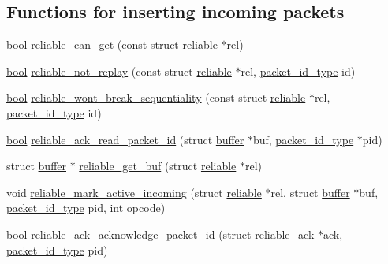 \subsection*{Functions for inserting incoming packets}
\begin{DoxyCompactItemize}
\item 
\hyperlink{automatic_8c_abb452686968e48b67397da5f97445f5b}{bool} \hyperlink{group__reliable_ga68f5e71b155cdcfabca18d028d336311}{reliable\+\_\+can\+\_\+get} (const struct \hyperlink{structreliable}{reliable} $\ast$rel)
\item 
\hyperlink{automatic_8c_abb452686968e48b67397da5f97445f5b}{bool} \hyperlink{group__reliable_ga907fd32837c50b4266eb5db1c56f9b13}{reliable\+\_\+not\+\_\+replay} (const struct \hyperlink{structreliable}{reliable} $\ast$rel, \hyperlink{packet__id_8h_a345f753b1c6ea20d24409e769aadb7e6}{packet\+\_\+id\+\_\+type} id)
\item 
\hyperlink{automatic_8c_abb452686968e48b67397da5f97445f5b}{bool} \hyperlink{group__reliable_gad2d6e3bde9beced3d69bbba652730439}{reliable\+\_\+wont\+\_\+break\+\_\+sequentiality} (const struct \hyperlink{structreliable}{reliable} $\ast$rel, \hyperlink{packet__id_8h_a345f753b1c6ea20d24409e769aadb7e6}{packet\+\_\+id\+\_\+type} id)
\item 
\hyperlink{automatic_8c_abb452686968e48b67397da5f97445f5b}{bool} \hyperlink{group__reliable_ga21a2f2e1296cea87eb6d68331667fc9e}{reliable\+\_\+ack\+\_\+read\+\_\+packet\+\_\+id} (struct \hyperlink{structbuffer}{buffer} $\ast$buf, \hyperlink{packet__id_8h_a345f753b1c6ea20d24409e769aadb7e6}{packet\+\_\+id\+\_\+type} $\ast$pid)
\item 
struct \hyperlink{structbuffer}{buffer} $\ast$ \hyperlink{group__reliable_gaa69117718f8e1e22881d957e219134ff}{reliable\+\_\+get\+\_\+buf} (struct \hyperlink{structreliable}{reliable} $\ast$rel)
\item 
void \hyperlink{group__reliable_ga2689b44850ce41cc2fe1fc7f57657eb4}{reliable\+\_\+mark\+\_\+active\+\_\+incoming} (struct \hyperlink{structreliable}{reliable} $\ast$rel, struct \hyperlink{structbuffer}{buffer} $\ast$buf, \hyperlink{packet__id_8h_a345f753b1c6ea20d24409e769aadb7e6}{packet\+\_\+id\+\_\+type} pid, int opcode)
\item 
\hyperlink{automatic_8c_abb452686968e48b67397da5f97445f5b}{bool} \hyperlink{group__reliable_ga3bdc89dd24741d52a2fcf8182389b947}{reliable\+\_\+ack\+\_\+acknowledge\+\_\+packet\+\_\+id} (struct \hyperlink{structreliable__ack}{reliable\+\_\+ack} $\ast$ack, \hyperlink{packet__id_8h_a345f753b1c6ea20d24409e769aadb7e6}{packet\+\_\+id\+\_\+type} pid)
\end{DoxyCompactItemize}

